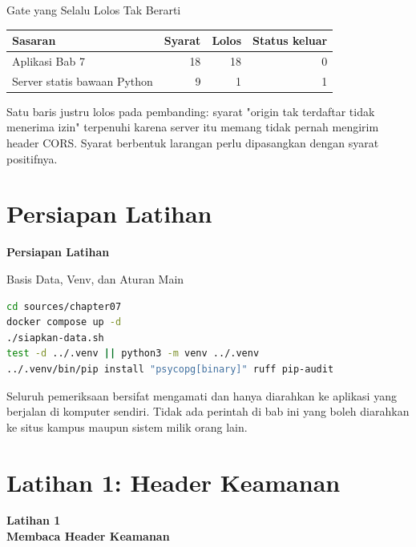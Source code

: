 \documentclass[aspectratio=169, table, 12pt]{beamer}
\begin{document}
\begin{frame}{{\Large Gate yang Selalu Lolos Tak Berarti}}
  \vspace{6pt}
  \centering
  {\footnotesize
  \begin{tabularx}{\textwidth}{Yrrr}
    \hline
    \textbf{Sasaran} & \textbf{Syarat} & \textbf{Lolos} & \textbf{Status keluar} \\
    \hline
    Aplikasi Bab 7 & 18 & 18 & 0 \\
    \hline
    Server statis bawaan Python & 9 & 1 & 1 \\
    \hline
  \end{tabularx}}

  \vspace{8pt}
  {\small Satu baris justru lolos pada pembanding: syarat "origin tak
  terdaftar tidak menerima izin" terpenuhi karena server itu memang tidak
  pernah mengirim header CORS. Syarat berbentuk larangan perlu dipasangkan
  dengan syarat positifnya.}
\end{frame}

\section{Persiapan Latihan}

\begin{frame}{\hfill}
  \centering
  \Huge{\textbf{Persiapan Latihan}}
\end{frame}

\begin{frame}[fragile]{{\Large Basis Data, Venv, dan Aturan Main}}
  \vspace{2pt}
\begin{lstlisting}[language=bash]
cd sources/chapter07
docker compose up -d
./siapkan-data.sh
test -d ../.venv || python3 -m venv ../.venv
../.venv/bin/pip install "psycopg[binary]" ruff pip-audit
\end{lstlisting}
  \vspace{4pt}
  {\small Seluruh pemeriksaan bersifat mengamati dan hanya diarahkan ke
  aplikasi yang berjalan di komputer sendiri. Tidak ada perintah di bab ini
  yang boleh diarahkan ke situs kampus maupun sistem milik orang lain.}
\end{frame}

\section{Latihan 1: Header Keamanan}

\begin{frame}{\hfill}
  \centering
  \Huge{\textbf{Latihan 1\\Membaca Header Keamanan}}
\end{frame}
\end{document}
